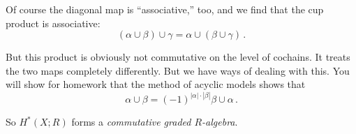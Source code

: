 Of course the diagonal map is ``associative,'' too, and we find that the
cup product is associative:
\[
(\alpha\cup\beta)\cup\gamma=\alpha\cup(\beta\cup\gamma)\,.
\]

But this product is obviously not commutative on the level of cochains. 
It treats the two maps completely differently. But we have ways of 
dealing with this. You will show for homework that the 
method of acyclic models shows that 
\[
\alpha\cup\beta=(-1)^{|\alpha|\cdot|\beta|}\beta\cup\alpha\,.
\]

So $ H^\ast(X;R)$ forms a \emph{commutative graded $R$-algebra}.
